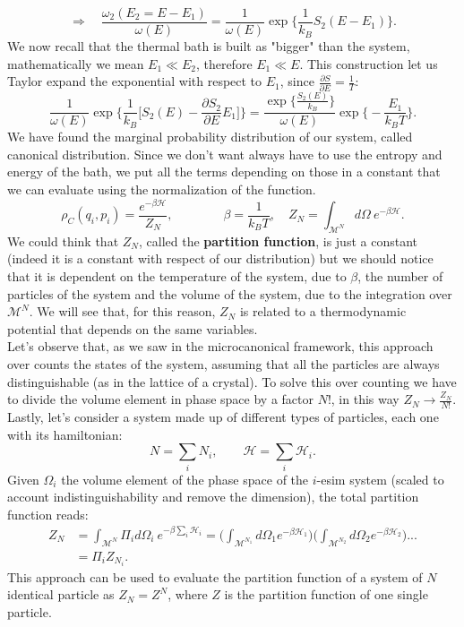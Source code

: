 \begin{equation*}
    \Rightarrow\quad \frac{\omega_2(E_2=E-E_1)}{\omega(E)}=\frac{1}{\omega(E)}\exp\bigg\{\frac{1}{k_B}S_2(E-E_1)\bigg\}.
\end{equation*}
We now recall that the thermal bath is built as "bigger" than the system, mathematically we mean $E_1\ll E_2$, therefore $E_1\ll E$. This construction let us Taylor expand the exponential with respect to $E_1$, since $\frac{\partial S}{\partial E}=\frac{1}{T}$:
\begin{equation*}
    \frac{1}{\omega(E)}\exp\bigg\{\frac{1}{k_B}\bigg[S_2(E)-\frac{\partial S_2}{\partial E}E_1\bigg]\bigg\}=\frac{\exp\big\{\frac{S_2(E)}{k_B}\big\}}{\omega(E)}\exp\bigg\{-\frac{E_1}{k_BT}\bigg\}.
\end{equation*}
We have found the marginal probability distribution of our system, called canonical distribution. Since we don't want always have to use the entropy and energy of the bath, we put all the terms depending on those in a constant that we can evaluate using the normalization of the function.
\begin{equation}\label{CanonicalDistribution}
    \rho_C(q_i,p_i)=\frac{e^{-\beta\mathcal{H} }}{Z_N},\qquad\qquad\beta=\frac{1}{k_BT},\quad Z_N=\int_{\mathcal{M} ^N}d\Omega\ e^{-\beta\mathcal{H} }.
\end{equation} 
We could think that $Z_N$, called the \textbf{partition function}, is just a constant (indeed it is a constant with respect of our distribution) but we should notice that it is dependent on the temperature of the system, due to $\beta$, the number of particles of the system and the volume of the system, due to the integration over $\mathcal{M}^N$. We will see that, for this reason, $Z_N$ is related to a thermodynamic potential that depends on the same variables.\\

Let's observe that, as we saw in the microcanonical framework, this approach over counts the states of the system, assuming that all the particles are always distinguishable (as in the lattice of a crystal). To solve this over counting we have to divide the volume element in phase space by a factor $N!$, in this way $Z_N\rightarrow\frac{Z_N}{N!}$.\\

Lastly, let's consider a system made up of different types of particles, each one with its hamiltonian:
\begin{equation*}
    N=\sum_{i}N_i,\qquad \mathcal{H} =\sum_i\mathcal{H}_i.
\end{equation*}
Given $\Omega_i$ the volume element of the phase space of the $i$-esim system (scaled to account indistinguishability and remove the dimension), the total partition function reads:
\begin{align*}
    Z_N&=\int_{\mathcal{M}^N}\Pi_id\Omega_i\ e^{-\beta\sum_i\mathcal{H}_i}=\bigg(\int_{\mathcal{M}^{N_1} }d\Omega_1e^{-\beta\mathcal{H}_1}\bigg)\bigg(\int_{\mathcal{M}^{N_2} }d\Omega_2e^{-\beta\mathcal{H}_2}\bigg)...\\&=\Pi_iZ_{N_i}.
\end{align*} 
This approach can be used to evaluate the partition function of a system of $N$ identical particle as $ Z_N=Z^N$, where $Z$ is the partition function of one single particle.

